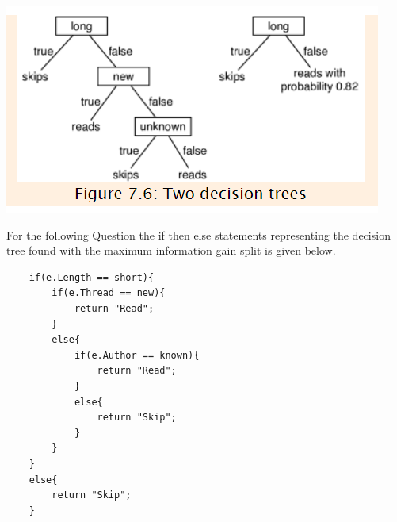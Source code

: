 \documentclass{article}
\newcommand*\fixindent{ \hspace{1pt}\\}
\begin{document}
\newpage
\begin{center}
\hspace*{1pt}\includegraphics{treeeeee.png}
\end{center}
For the following Question the if then else statements representing the decision tree found with the maximum information gain split is given below.\\
\begin{lstlisting}
    if(e.Length == short){
        if(e.Thread == new){
            return "Read";
        }
        else{
            if(e.Author == known){
                return "Read";
            }
            else{
                return "Skip";
            }
        }
    }
    else{
        return "Skip";
    }
\end{lstlisting}
\fixindent{}\fixindent{}\fixindent{}\fixindent{}\fixindent{}\fixindent{}\fixindent{}
\end{document}
